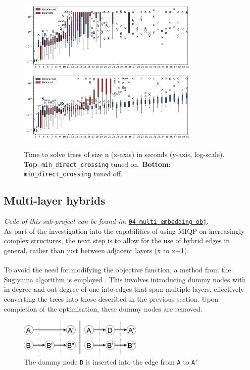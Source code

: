 \documentclass{article}
\begin{document}
\begin{figure}[H]
    \centering
    \includegraphics[width=0.8\textwidth]{figures/03_perf_min_crossing.pdf}\\
    \includegraphics[width=0.8\textwidth]{figures/03_perf_without.pdf}\\
    \caption{Time to solve trees of size n (x-axis) in seconds (y-axis, log-scale). \textbf{Top}: \texttt{min\_direct\_crossing} tuned on. \textbf{Bottom}: \texttt{min\_direct\_crossing} tuned off.}
    \label{fig:runtime-tree}
\end{figure}
\newpage
\subsection*{Multi-layer hybrids}
\textit{Code of this sub-project can be found in: }\href{https://github.com/not-a-feature/Layouting-Phylogenetic-Networks-using-MIQP/tree/main/04_mult_embedding_obj}{\texttt{04\_multi\_embedding\_obj}}.\\
As part of the investigation into the capabilities of using \ac{MIQP} on increasingly complex structures, the next step is to allow for the use of hybrid edges in general, rather than just between adjacent layers (x to x+1).\\\\

To avoid the need for modifying the objective function, a method from the Sugiyama algorithm is employed \cite{sugiyama}. This involves introducing dummy nodes with in-degree and out-degree of one into edges that span multiple layers, effectively converting the trees into those described in the previous section. Upon completion of the optimisation, these dummy nodes are removed.
\begin{figure}[H]
    \centering
    \includegraphics[width=6cm]{figures/dummy_nodes.pdf}
    \caption{The dummy node \texttt{D} is inserted into the edge from \texttt{A} to \texttt{A'}}
    \label{fig:dummy}
\end{figure}
\end{document}
